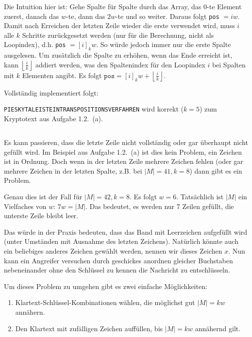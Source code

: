 \documentclass{../crypto}
\begin{document}
Die Intuition hier ist: Gehe Spalte für Spalte durch das Array, das $0$-te
Element zuerst, danach das $w$-te, dann das $2w$-te und so weiter. Daraus folgt
\texttt{pos} $= iw$. Damit nach Erreichen der letzten Zeile wieder die erste
verwendet wird, muss $i$ alle $k$ Schritte zurückgesetzt werden (nur für die
Berechnung, nicht als Loopindex), d.h. \texttt{pos} $= \left[i\right]_kw$. So
würde jedoch immer nur die erste Spalte ausgelesen. Um zusätzlich die Spalte zu
erhöhen, wenn das Ende erreicht ist, kann $\left\lfloor\frac{i}{k}\right\rfloor$
addiert werden, was den Spaltenindex für den Loopindex $i$ bei Spalten mit $k$
Elementen angibt. Es folgt $\texttt{pos} = \left[i\right]_kw +
\left\lfloor\frac{i}{k}\right\rfloor$.

Vollständig implementiert folgt:

\texttt{PIESKYTALEISTEINTRANSPOSITIONSVERFAHREN} wird korrekt ($k=5$) zum Kryptotext aus Aufgabe 1.2.~(a).

\subsection{}
Es kann passieren, dass die letzte Zeile nicht vollständig oder gar überhaupt
nicht gefüllt wird. Im Beispiel aus Aufgabe 1.2.~(a) ist dies kein Problem, ein
Zeichen ist in Ordnung.  Doch wenn in der letzten Zeile mehrere Zeichen fehlen
(oder gar mehrere Zeichen in der letzten Spalte, z.B. bei $|M|=41, k=8$) dann
gibt es ein Problem.

Genau dies ist der Fall für $|M|=42, k=8$. Es folgt $w=6$. Tatsächlich ist $|M|$
ein Vielfaches von $w$: $7w=|M|$. Das bedeutet, es werden nur 7 Zeilen gefüllt,
die unterste Zeile bleibt leer.

Das würde in der Praxis bedeuten, dass das Band mit Leerzeichen aufgefüllt wird
(unter Umständen mit Ausnahme des letzten Zeichens). Natürlich könnte auch ein
beliebiges anderes Zeichen gewählt werden, nennen wir dieses Zeichen $x$. Nun
kann ein Angreifer versuchen durch geschickes anordnen gleicher Buchstaben
nebeneinander ohne den Schlüssel zu kennen die Nachricht zu entschlüsseln.

Um dieses Problem zu umgehen gibt es zwei einfache Möglichkeiten:

\begin{enumerate}
  \item Klartext-Schlüssel-Kombinationen wählen, die möglichst gut $|M|=kw$ annähern.
  \item Den Klartext mit zufälligen Zeichen auffüllen, bis $|M|=kw$ annähernd gilt.
\end{enumerate}
\end{document}
